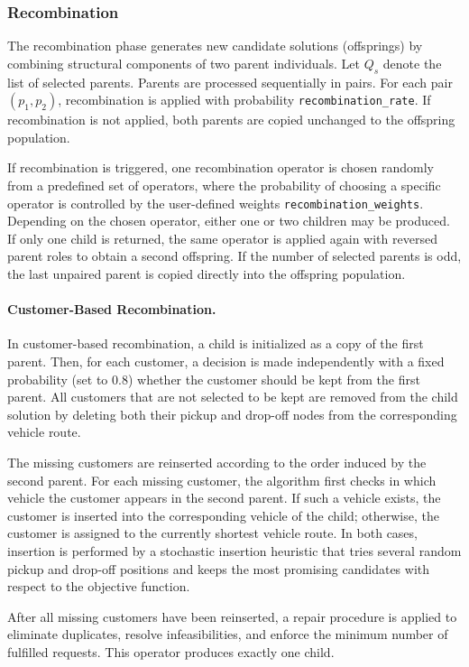 \documentclass[12pt]{article}
\begin{document}
\subsubsection{Recombination}

The recombination phase generates new candidate solutions (offsprings) by combining structural components of two parent individuals. Let $Q_s$ denote the list of selected parents. Parents are processed sequentially in pairs. For each pair $(p_1, p_2)$, recombination is applied with probability \texttt{recombination\_rate}. If recombination is not applied, both parents are copied unchanged to the offspring population.

If recombination is triggered, one recombination operator is chosen randomly from a predefined set of operators, where the probability of choosing a specific operator is controlled by the user-defined weights \texttt{recombination\_weights}. Depending on the chosen operator, either one or two children may be produced. If only one child is returned, the same operator is applied again with reversed parent roles to obtain a second offspring. If the number of selected parents is odd, the last unpaired parent is copied directly into the offspring population.


\paragraph{Customer-Based Recombination.}
In customer-based recombination, a child is initialized as a copy of the first parent. Then, for each customer, a decision is made independently with a fixed probability (set to $0.8$) whether the customer should be kept from the first parent. All customers that are not selected to be kept are removed from the child solution by deleting both their pickup and drop-off nodes from the corresponding vehicle route.

The missing customers are reinserted according to the order induced by the second parent. For each missing customer, the algorithm first checks in which vehicle the customer appears in the second parent. If such a vehicle exists, the customer is inserted into the corresponding vehicle of the child; otherwise, the customer is assigned to the currently shortest vehicle route. In both cases, insertion is performed by a stochastic insertion heuristic that tries several random pickup and drop-off positions and keeps the most promising candidates with respect to the objective function.

After all missing customers have been reinserted, a repair procedure is applied to eliminate duplicates, resolve infeasibilities, and enforce the minimum number of fulfilled requests. This operator produces exactly one child.
\end{document}
